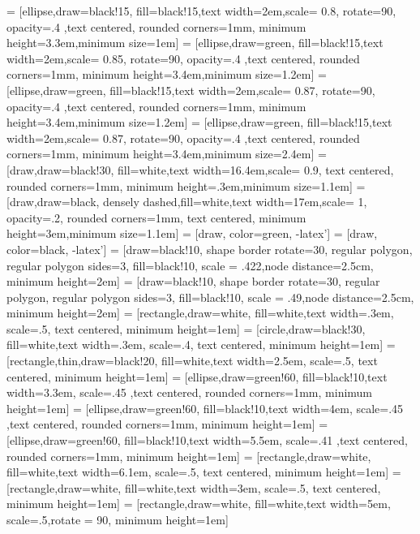\usepackage{tikz}
\usetikzlibrary{shapes,arrows}
\usetikzlibrary{positioning,shadows,arrows}
\usetikzlibrary{calc}
\usepackage{verbatim}
 = [ellipse,draw=black!15, fill=black!15,text width=2em,scale= 0.8, rotate=90, opacity=.4 ,text centered, rounded corners=1mm, minimum height=3.3em,minimum size=1em]
 = [ellipse,draw=green, fill=black!15,text width=2em,scale= 0.85, rotate=90, opacity=.4 ,text centered, rounded corners=1mm, minimum height=3.4em,minimum size=1.2em]
 = [ellipse,draw=green, fill=black!15,text width=2em,scale= 0.87, rotate=90, opacity=.4 ,text centered, rounded corners=1mm, minimum height=3.4em,minimum size=1.2em]
 = [ellipse,draw=green, fill=black!15,text width=2em,scale= 0.87, rotate=90, opacity=.4 ,text centered, rounded corners=1mm, minimum height=3.4em,minimum size=2.4em]
 = [draw,draw=black!30, fill=white,text width=16.4em,scale= 0.9, text centered, rounded corners=1mm, minimum height=.3em,minimum size=1.1em]
 = [draw,draw=black, densely dashed,fill=white,text width=17em,scale= 1, opacity=.2, rounded corners=1mm, text centered, minimum height=3em,minimum size=1.1em]
 = [draw,  color=green, -latex']
 = [draw,  color=black, -latex']
 = [draw=black!10, shape border rotate=30, regular polygon, regular polygon sides=3, fill=black!10, scale = .422,node distance=2.5cm, minimum height=2em]
 = [draw=black!10, shape border rotate=30, regular polygon, regular polygon sides=3, fill=black!10, scale = .49,node distance=2.5cm, minimum height=2em]
 = [rectangle,draw=white, fill=white,text width=.3em, scale=.5, text centered, minimum height=1em]
 = [circle,draw=black!30, fill=white,text width=.3em, scale=.4, text centered, minimum height=1em]
 = [rectangle,thin,draw=black!20, fill=white,text width=2.5em, scale=.5, text centered, minimum height=1em]
 = [ellipse,draw=green!60, fill=black!10,text width=3.3em, scale=.45 ,text centered, rounded corners=1mm, minimum height=1em]
 = [ellipse,draw=green!60, fill=black!10,text width=4em, scale=.45 ,text centered, rounded corners=1mm, minimum height=1em]
 = [ellipse,draw=green!60, fill=black!10,text width=5.5em, scale=.41 ,text centered, rounded corners=1mm, minimum height=1em]
 = [rectangle,draw=white, fill=white,text width=6.1em, scale=.5, text centered, minimum height=1em]
 = [rectangle,draw=white, fill=white,text width=3em, scale=.5, text centered, minimum height=1em]
 = [rectangle,draw=white, fill=white,text width=5em, scale=.5,rotate = 90, minimum height=1em]


